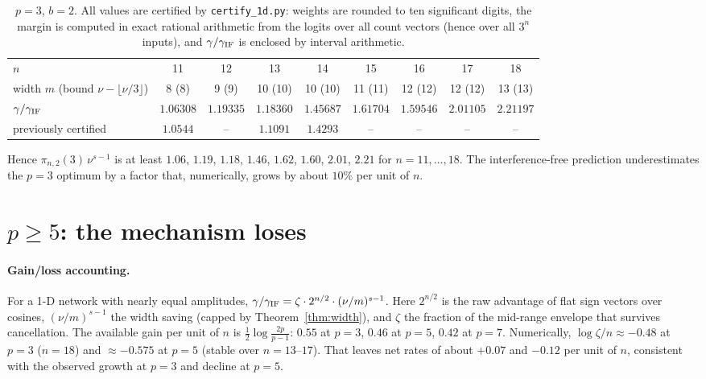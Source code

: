\documentclass[11pt]{article}
\theoremstyle{definition}
\begin{document}
\begin{table}[h]
\centering\small\setlength{\tabcolsep}{4pt}
\begin{tabular}{lcccccccc}
\toprule
$n$ & 11 & 12 & 13 & 14 & 15 & 16 & 17 & 18\\
width $m$ (bound $\nu-\lfloor\nu/3\rfloor$) & 8 (8) & 9 (9) & 10 (10) & 10 (10) & 11 (11) & 12 (12) & 12 (12) & 13 (13)\\
$\gamma/\gamma_{\rm IF}$ & $1.06308$ & $1.19335$ & $1.18360$ & $1.45687$ & $1.61704$ & $1.59546$ & $2.01105$ & $2.21197$\\
previously certified & $1.0544$ & -- & $1.1091$ & $1.4293$ & -- & -- & -- & --\\
\bottomrule
\end{tabular}
\caption{$p=3$, $b=2$.  All values are certified by \texttt{certify\_1d.py}: weights are rounded to ten
significant digits, the margin is computed in exact rational arithmetic from the logits over all count vectors (hence over
all $3^n$ inputs), and $\gamma/\gamma_{\rm IF}$ is enclosed by interval arithmetic.}
\label{tab:p3}
\end{table}

Hence $\pi_{n,2}(3)\,\nu^{s-1}$ is at least $1.06$, $1.19$, $1.18$, $1.46$, $1.62$, $1.60$, $2.01$, $2.21$ for
$n=11,\dots,18$.  The interference-free prediction
underestimates the $p=3$ optimum by a factor that, numerically, grows by about $10\%$ per unit of $n$.

\section{$p\ge5$: the mechanism loses}\label{sec:p5}
\paragraph{Gain/loss accounting.}  For a 1-D network with nearly equal amplitudes,
$\gamma/\gamma_{\rm IF}=\zeta\cdot2^{n/2}\cdot(\nu/m)^{s-1}$.  Here $2^{n/2}$ is the raw advantage of flat sign vectors
over cosines, $(\nu/m)^{s-1}$ the width saving (capped by Theorem~\ref{thm:width}), and $\zeta$ the fraction of the
mid-range envelope that survives cancellation.  The available gain per unit of $n$ is
$\tfrac12\log\frac{2p}{p-1}$: $0.55$ at $p=3$, $0.46$ at $p=5$, $0.42$ at $p=7$.  Numerically, $\log\zeta/n\approx-0.48$ at $p=3$ ($n=18$) and
$\approx-0.575$ at $p=5$ (stable over $n=13$--$17$).  That leaves net rates of about $+0.07$ and $-0.12$ per unit of $n$,
consistent with the observed growth at $p=3$ and decline at $p=5$.
\end{document}
